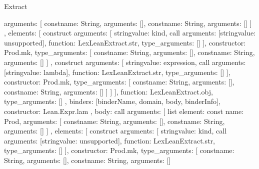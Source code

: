 \begin{lexlean}{Extract}
\begin{toolingmodule}
{{{{{{{                    arguments: [
                      const{name: String, arguments: []},
                      const{name: String, arguments: []}
                    ]
                  },
                  elements: [
                    construct{
                      arguments: [
                        string{value: kind},
                        call{
                          arguments: [string{value: unsupported}],
                          function: LexLeanExtract.str,
                          type_arguments: []
                        }
                      ],
                      constructor: Prod.mk,
                      type_arguments: [
                        const{name: String, arguments: []},
                        const{name: String, arguments: []}
                      ]
                    },
                    construct{
                      arguments: [
                        string{value: expression},
                        call{
                          arguments: [string{value: lambda}],
                          function: LexLeanExtract.str,
                          type_arguments: []
                        }
                      ],
                      constructor: Prod.mk,
                      type_arguments: [
                        const{name: String, arguments: []},
                        const{name: String, arguments: []}
                      ]
                    }
                  ]
                }
              ],
              function: LexLeanExtract.obj,
              type_arguments: []
            },
            binders: [binderName, domain, body, binderInfo],
            constructor: Lean.Expr.lam
          },
          {
            body: call{
              arguments: [
                list{
                  element: const{
                    name: Prod,
                    arguments: [
                      const{name: String, arguments: []},
                      const{name: String, arguments: []}
                    ]
                  },
                  elements: [
                    construct{
                      arguments: [
                        string{value: kind},
                        call{
                          arguments: [string{value: unsupported}],
                          function: LexLeanExtract.str,
                          type_arguments: []
                        }
                      ],
                      constructor: Prod.mk,
                      type_arguments: [
                        const{name: String, arguments: []},
                        const{name: String, arguments: []}
}}}}}}}
\end{toolingmodule}
\end{lexlean}
